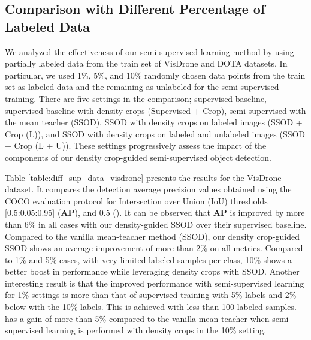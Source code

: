 \subsection{Comparison with Different Percentage of Labeled Data}
We analyzed the effectiveness of our semi-supervised learning method by using partially labeled data from the train set of VisDrone and DOTA datasets. In particular, we used 1\%, 5\%, and 10\% randomly chosen data points from the train set as labeled data and the remaining as unlabeled for the semi-supervised training. There are five settings in the comparison; supervised baseline, supervised baseline with density crops (Supervised + Crop), semi-supervised with the mean teacher (SSOD), SSOD with density crops on labeled images (SSOD + Crop (L)), and SSOD with density crops on labeled and unlabeled images (SSOD + Crop (L + U)). These settings progressively assess the impact of the components of our density crop-guided semi-supervised object detection.

Table \ref{table:diff_sup_data_visdrone} presents the results for the VisDrone\cite{zhu-VisDrone-2018} dataset.  It compares the detection average precision values obtained using the COCO evaluation protocol \cite{mscoco-Lin-2014} for Intersection over Union (IoU) thresholds [0.5:0.05:0.95] (\textbf{AP}), and 0.5 (\textbf{}). It can be observed that \textbf{AP} is improved by more than 6\% in all cases with our density-guided SSOD over their supervised baseline. Compared to the vanilla mean-teacher method (SSOD), our density crop-guided SSOD shows an average improvement of more than 2\% on all metrics. Compared to 1\% and 5\% cases, with very limited labeled samples per class, 10\% shows a better boost in performance while leveraging density crops with SSOD. Another interesting result is that the improved performance with semi-supervised learning for 1\% settings is more than that of supervised training with 5\% labels and 2\% below with the 10\% labels. This is achieved with less than 100 labeled samples.  has a gain of more than 5\% compared to the vanilla mean-teacher when semi-supervised learning is performed with density crops in the 10\% setting.  

